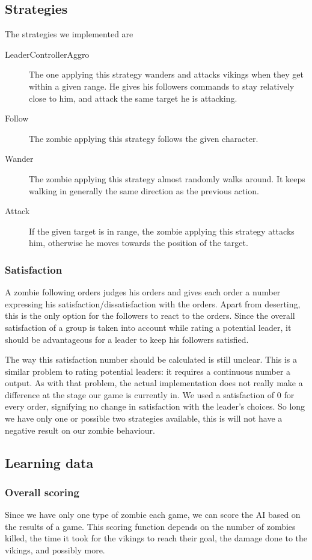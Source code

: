 \subsection{Strategies}
The strategies we implemented are
\begin{description}
 \item [LeaderControllerAggro] The one applying this strategy wanders and attacks vikings when they get within a given range. He gives his followers commands to stay relatively close to him, and attack the same target he is attacking.
 \item [Follow] The zombie applying this strategy follows the given character.
 \item [Wander] The zombie applying this strategy almost randomly walks around. It keeps walking in generally the same direction as the previous action.
 \item [Attack] If the given target is in range, the zombie applying this strategy attacks him, otherwise he moves towards the position of the target.
\end{description}

\subsubsection{Satisfaction}
\label{sec:satisfaction}
A zombie following orders judges his orders and gives each order a number expressing his satisfaction/dissatisfaction with the orders. Apart from deserting, this is the only option for the followers to react to the orders. Since the overall satisfaction of a group is taken into account while rating a potential leader, it should be advantageous for a leader to keep his followers satisfied.

The way this satisfaction number should be calculated is still unclear. This is a similar problem to rating potential leaders: it requires a continuous number a output. As with that problem, the actual implementation does not really make a difference at the stage our game is currently in. We used a satisfaction of $0$ for every order, signifying no change in satisfaction with the leader's choices. So long we have only one or possible two strategies available, this is will not have a negative result on our zombie behaviour.

\subsection{Learning data}
\label{sec:learning_data}
\subsubsection{Overall scoring}
Since we have only one type of zombie each game, we can score the AI based on the results of a game. This scoring function depends on the number of zombies killed, the time it took for the vikings to reach their goal, the damage done to the vikings, and possibly more.

